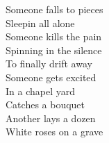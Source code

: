 Someone falls to pieces \\
Sleepin all alone \\
Someone kills the pain \\
Spinning in the silence \\
To finally drift away \\
Someone gets excited \\
In a chapel yard \\
Catches a bouquet \\
Another lays a dozen \\
White roses on a grave
